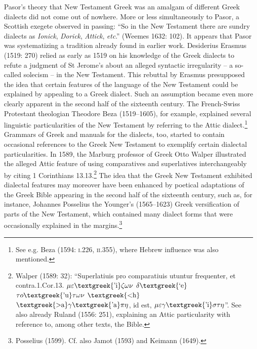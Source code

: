\begin{styleStandard}
\end{styleStandard}

\begin{styleStandard}
Pasor’s theory that New Testament Greek was an amalgam of different Greek dialects did not come out of nowhere. More or less simultaneously to Pasor, a Scottish exegete observed in passing: “So in the New Testament there are sundry dialects as \textit{Ionick}, \textit{Dorick},\textit{ Attick}, \textit{etc}.” (Weemes 1632: 102). It appears that Pasor was systematizing a tradition already found in earlier work. Desiderius Erasmus (1519: 270) relied as early as 1519 on his knowledge of the Greek dialects to refute a judgment of St Jerome’s about an alleged syntactic irregularity – a so-called solecism – in the New Testament. This rebuttal by Erasmus presupposed the idea that certain features of the language of the New Testament could be explained by appealing to a Greek dialect. Such an assumption became even more clearly apparent in the second half of the sixteenth century. The French-Swiss Protestant theologian Theodore Beza (1519–1605), for example, explained several linguistic particularities of the New Testament by referring to the Attic dialect.\footnote{ See e.g. Beza (1594: \textsc{i.}226, \textsc{ii}.355), where Hebrew influence was also mentioned.} Grammars of Greek and manuals for the dialects, too, started to contain occasional references to the Greek New Testament to exemplify certain dialectal particularities. In 1589, the Marburg professor of Greek Otto Walper illustrated the alleged Attic feature of using comparatives and superlatives interchangeably by citing 1 Corinthians 13.13.\footnote{ Walper (1589: 32): “Superlatiuis pro comparatiuis utuntur frequenter, et contra.1.Cor.13. $\mu \varepsilon \text{\textgreek{'i}}\zeta \omega \nu $ $\delta \text{\textgreek{`e}}$ $\tau o\text{\textgreek{'u}}\tau \omega \nu $ $\text{\textgreek{<h}}$ $\text{\textgreek{>a}}\gamma \text{\textgreek{'a}}\pi \eta $, id est, $\mu \varepsilon \gamma \text{\textgreek{'i}}\sigma \tau \eta $”. See also already Ruland (1556: 251), explaining an Attic particularity with reference to, among other texts, the Bible.} The idea that the Greek New Testament exhibited dialectal features may moreover have been enhanced by poetical adaptations of the Greek Bible appearing in the second half of the sixteenth century, such as, for instance, Johannes Posselius the Younger’s (1565–1623) Greek versification of parts of the New Testament, which contained many dialect forms that were occasionally explained in the margins.\footnote{ Posselius (1599). Cf. also Jamot (1593) and Keimann (1649).}
\end{styleStandard}


